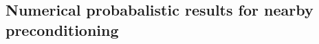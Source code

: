 


    




\subsection{Numerical probabalistic results for nearby preconditioning}\label{sec:qualgmres}

